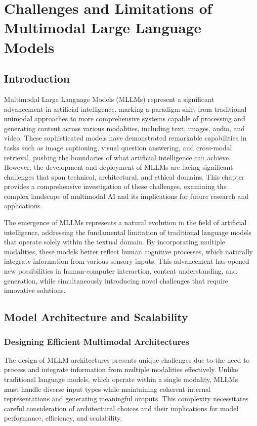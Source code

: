 \chapter{Challenges and Limitations of Multimodal Large Language Models}



\section{Introduction}
Multimodal Large Language Models (MLLMs) represent a significant advancement in artificial intelligence, marking a paradigm shift from traditional unimodal approaches to more comprehensive systems capable of processing and generating content across various modalities, including text, images, audio, and video. These sophisticated models have demonstrated remarkable capabilities in tasks such as image captioning, visual question answering, and cross-modal retrieval, pushing the boundaries of what artificial intelligence can achieve. However, the development and deployment of MLLMs are facing significant challenges that span technical, architectural, and ethical domains. This chapter provides a comprehensive investigation of these challenges, examining the complex landscape of multimodal AI and its implications for future research and applications.

The emergence of MLLMs represents a natural evolution in the field of artificial intelligence, addressing the fundamental limitation of traditional language models that operate solely within the textual domain. By incorporating multiple modalities, these models better reflect human cognitive processes, which naturally integrate information from various sensory inputs. This advancement has opened new possibilities in human-computer interaction, content understanding, and generation, while simultaneously introducing novel challenges that require innovative solutions.

\section{Model Architecture and Scalability}

\subsection{Designing Efficient Multimodal Architectures}
The design of MLLM architectures presents unique challenges due to the need to process and integrate information from multiple modalities effectively. Unlike traditional language models, which operate within a single modality, MLLMs must handle diverse input types while maintaining coherent internal representations and generating meaningful outputs. This complexity necessitates careful consideration of architectural choices and their implications for model performance, efficiency, and scalability.

